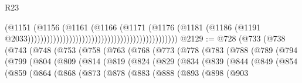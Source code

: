 \begin{lexlean}{R23}
\begin{coremodule}
                                                                                (@1151
                                                                                  (@1156
                                                                                    (@1161
                                                                                      (@1166
                                                                                        (@1171
                                                                                          (@1176
                                                                                            (@1181
                                                                                              (@1186
                                                                                                (@1191
                                                                                                  @2033)))))))))))))))))))))))))))))))))))))))))))))))
@2129 := @728
    (@733
      (@738
        (@743
          (@748
            (@753
              (@758
                (@763
                  (@768
                    (@773
                      (@778
                        (@783
                          (@788
                            (@789
                              (@794
                                (@799
                                  (@804
                                    (@809
                                      (@814
                                        (@819
                                          (@824
                                            (@829
                                              (@834
                                                (@839
                                                  (@844
                                                    (@849
                                                      (@854
                                                        (@859
                                                          (@864
                                                            (@868
                                                              (@873
                                                                (@878
                                                                  (@883
                                                                    (@888
                                                                      (@893
                                                                        (@898
                                                                          (@903

\end{coremodule}
\end{lexlean}
